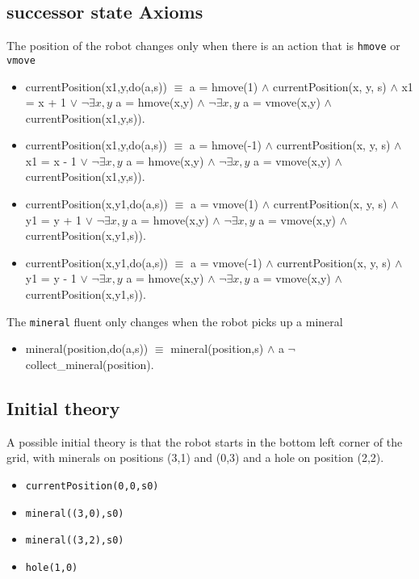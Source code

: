 \documentclass{article}
\begin{document}
\subsection{successor state Axioms}
The position of the robot changes only when there is an action that is \texttt{hmove} or \texttt{vmove}
\begin{itemize}
\item currentPosition(x1,y,do(a,s)) $\equiv$ a = hmove(1) $\wedge$ currentPosition(x, y, s) $\wedge$ x1 = x + 1 $\vee$ $\neg\exists x,y$ a = hmove(x,y) $\wedge$ $\neg\exists x,y$ a = vmove(x,y) $\wedge$ currentPosition(x1,y,s)).
\item currentPosition(x1,y,do(a,s)) $\equiv$ a = hmove(-1) $\wedge$ currentPosition(x, y, s) $\wedge$ x1 = x - 1 $\vee$ $\neg\exists x,y$ a = hmove(x,y) $\wedge$ $\neg\exists x,y$ a = vmove(x,y) $\wedge$ currentPosition(x1,y,s)).
\item currentPosition(x,y1,do(a,s)) $\equiv$ a = vmove(1) $\wedge$ currentPosition(x, y, s) $\wedge$ y1 = y + 1 $\vee$ $\neg\exists x,y$ a = hmove(x,y) $\wedge$ $\neg\exists x,y$ a = vmove(x,y) $\wedge$ currentPosition(x,y1,s)).
\item currentPosition(x,y1,do(a,s)) $\equiv$ a = vmove(-1) $\wedge$ currentPosition(x, y, s) $\wedge$ y1 = y - 1 $\vee$ $\neg\exists x,y$ a = hmove(x,y) $\wedge$ $\neg\exists x,y$ a = vmove(x,y) $\wedge$ currentPosition(x,y1,s)).
\end{itemize}

The \texttt{mineral} fluent only changes when the robot picks up a mineral
\begin{itemize}
\item mineral(position,do(a,s)) $\equiv$ mineral(position,s) $\wedge$ a $\neg$ collect\_mineral(position).
\end{itemize}

\subsection{Initial theory}
A possible initial theory is that the robot starts in the bottom left corner of the grid, with minerals on positions (3,1) and (0,3) and a hole on position (2,2).
\begin{itemize}
\item \texttt{currentPosition(0,0,s0)}
\item \texttt{mineral((3,0),s0)}
\item \texttt{mineral((3,2),s0)}
\item \texttt{hole(1,0)}

\end{itemize}
\end{document}
